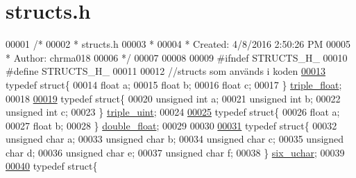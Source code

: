 \hypertarget{structs_8h_source}{}\section{structs.\+h}
\label{structs_8h_source}

\begin{DoxyCode}
00001 \textcolor{comment}{/*}
00002 \textcolor{comment}{ * structs.h}
00003 \textcolor{comment}{ *}
00004 \textcolor{comment}{ * Created: 4/8/2016 2:50:26 PM}
00005 \textcolor{comment}{ *  Author: chrma018}
00006 \textcolor{comment}{ */} 
00007 
00008 
00009 \textcolor{preprocessor}{#ifndef STRUCTS\_H\_}
00010 \textcolor{preprocessor}{#define STRUCTS\_H\_}
00011 
00012 \textcolor{comment}{//structs som används i koden}
\hypertarget{structs_8h_source.tex_l00013}{}\hyperlink{structtriple__float}{00013} \textcolor{keyword}{typedef} \textcolor{keyword}{struct}\{
00014     \textcolor{keywordtype}{float} a;
00015     \textcolor{keywordtype}{float} b;
00016     \textcolor{keywordtype}{float} c;
00017 \} \hyperlink{structtriple__float}{triple\_float};
00018 
\hypertarget{structs_8h_source.tex_l00019}{}\hyperlink{structtriple__uint}{00019} \textcolor{keyword}{typedef} \textcolor{keyword}{struct}\{
00020     \textcolor{keywordtype}{unsigned} \textcolor{keywordtype}{int} a;
00021     \textcolor{keywordtype}{unsigned} \textcolor{keywordtype}{int} b;
00022     \textcolor{keywordtype}{unsigned} \textcolor{keywordtype}{int} c;
00023 \} \hyperlink{structtriple__uint}{triple\_uint};
00024 
\hypertarget{structs_8h_source.tex_l00025}{}\hyperlink{structdouble__float}{00025} \textcolor{keyword}{typedef} \textcolor{keyword}{struct}\{
00026     \textcolor{keywordtype}{float} a;
00027     \textcolor{keywordtype}{float} b;
00028 \} \hyperlink{structdouble__float}{double\_float};
00029 
00030 
\hypertarget{structs_8h_source.tex_l00031}{}\hyperlink{structsix__uchar}{00031} \textcolor{keyword}{typedef} \textcolor{keyword}{struct}\{
00032     \textcolor{keywordtype}{unsigned} \textcolor{keywordtype}{char} a;
00033     \textcolor{keywordtype}{unsigned} \textcolor{keywordtype}{char} b;
00034     \textcolor{keywordtype}{unsigned} \textcolor{keywordtype}{char} c;
00035     \textcolor{keywordtype}{unsigned} \textcolor{keywordtype}{char} d;
00036     \textcolor{keywordtype}{unsigned} \textcolor{keywordtype}{char} e;
00037     \textcolor{keywordtype}{unsigned} \textcolor{keywordtype}{char} f;
00038 \} \hyperlink{structsix__uchar}{six\_uchar};
00039 
\hypertarget{structs_8h_source.tex_l00040}{}\hyperlink{structdouble__uchar}{00040} \textcolor{keyword}{typedef} \textcolor{keyword}{struct}\{

\end{DoxyCode}
